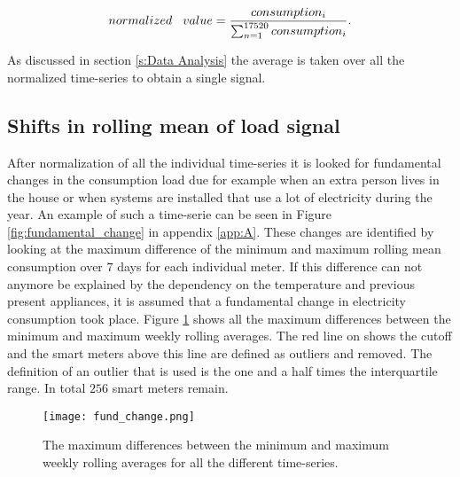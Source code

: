 \begin{equation}\label{eq:norm}
	normalized\hspace{0.3cm} value = \frac{consumption_i}{\sum_{n=1}^{17520} consumption_i}.
\end{equation} 

As discussed in section \ref{s:Data Analysis} the average is taken over all the normalized time-series to obtain a single signal.  


\subsection{Shifts in rolling mean of load signal} \label{s:Shifts in rolling mean of load signal}
After normalization of all the individual time-series it is looked for fundamental changes in the consumption load due for example when an extra person lives in the house or when systems are installed that use a lot of electricity during the year. An example of such a time-serie can be seen in Figure \ref{fig:fundamental_change} in appendix \ref{app:A}.
These changes are identified by looking at the maximum difference of the minimum and maximum rolling mean consumption over $ 7 $ days for each individual meter. If this difference can not anymore be explained by the dependency on the temperature and previous present appliances, it is assumed that a fundamental change in electricity consumption took place. 
 Figure \ref{fig:fund_change} shows all the maximum differences between the minimum and maximum weekly rolling averages. The red line on shows the cutoff and the smart meters above this line are defined as outliers and removed. The definition of an outlier that is used is the one and a half times the interquartile range. In total $ 256 $ smart meters remain. 


\begin{figure}[h!]
	\centering
	\texttt{[image: fund\_change.png]}
	\caption{The maximum differences between the minimum and maximum weekly rolling averages for all the different time-series.}
	\label{fig:fund_change}
\end{figure}




